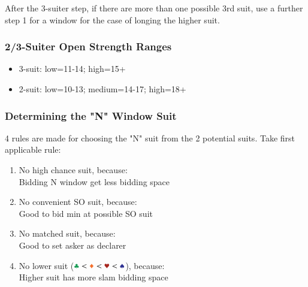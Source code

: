 \documentclass{article}
\begin{document}
\begin{multicols}{2}
\begin{CJK*}{UTF8}{gt}
\noindent After the 3-suiter step, if there are more than one possible 3rd suit, use a further step 1 for a window for the case of longing the higher suit.

\subsubsection{2/3-Suiter Open Strength Ranges}
\begin{itemize}
    \item 3-suit: low=11-14; high=15+
    \item 2-suit: low=10-13; medium=14-17; high=18+
\end{itemize}

\subsubsection{Determining the "N" Window Suit}\label{sec:determine-n-suit}
4 rules are made for choosing the "N" suit from the 2 potential suits. Take first applicable rule:
\begin{enumerate}
    \item No high chance suit, because:\\
    Bidding N window get less bidding space
    \item No convenient SO suit, because:\\
    Good to bid min at possible SO suit
    \item No matched suit, because:\\
    Good to set asker as declarer
    \item No lower suit ($\ccc<\ddd<\hhh<\sss$), because:\\
    Higher suit has more slam bidding space
\end{enumerate}


\end{CJK*}
\end{multicols}
\end{document}
